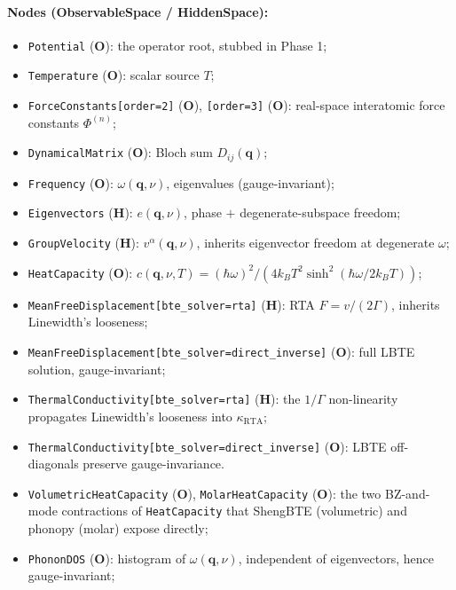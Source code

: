 \documentclass[11pt,a4paper]{article}
\begin{document}
\paragraph{Nodes (ObservableSpace / HiddenSpace):}
\begin{itemize}[leftmargin=2em, itemsep=0.2em]
  \item \texttt{Potential} (\textbf{O}): the operator root, stubbed in Phase 1;
  \item \texttt{Temperature} (\textbf{O}): scalar source $T$;
  \item \texttt{ForceConstants[order=2]} (\textbf{O}), \texttt{[order=3]} (\textbf{O}):
        real-space interatomic force constants $\Phi^{(n)}$;
  \item \texttt{DynamicalMatrix} (\textbf{O}): Bloch sum $D_{ij}(\mathbf{q})$;
  \item \texttt{Frequency} (\textbf{O}): $\omega(\mathbf{q},\nu)$, eigenvalues
        (gauge-invariant);
  \item \texttt{Eigenvectors} (\textbf{H}): $e(\mathbf{q},\nu)$, phase $+$
        degenerate-subspace freedom;
  \item \texttt{GroupVelocity} (\textbf{H}): $v^\alpha(\mathbf{q},\nu)$, inherits
        eigenvector freedom at degenerate $\omega$;
  \item \texttt{HeatCapacity} (\textbf{O}): $c(\mathbf{q},\nu, T) = (\hbar\omega)^2 /
        (4 k_B T^2 \sinh^2(\hbar\omega / 2 k_B T))$;
  \item \texttt{MeanFreeDisplacement[bte\_solver=rta]} (\textbf{H}): RTA
        $F = v/(2\Gamma)$, inherits Linewidth's looseness;
  \item \texttt{MeanFreeDisplacement[bte\_solver=direct\_inverse]} (\textbf{O}): full
        LBTE solution, gauge-invariant;
  \item \texttt{ThermalConductivity[bte\_solver=rta]} (\textbf{H}): the $1/\Gamma$
        non-linearity propagates Linewidth's looseness into $\kappa_\text{RTA}$;
  \item \texttt{ThermalConductivity[bte\_solver=direct\_inverse]} (\textbf{O}):
        LBTE off-diagonals preserve gauge-invariance.
  \item \texttt{VolumetricHeatCapacity} (\textbf{O}), \texttt{MolarHeatCapacity}
        (\textbf{O}): the two BZ-and-mode contractions of \texttt{HeatCapacity}
        that ShengBTE (volumetric) and phonopy (molar) expose directly;
  \item \texttt{PhononDOS} (\textbf{O}): histogram of $\omega(\mathbf{q},\nu)$,
        independent of eigenvectors, hence gauge-invariant;

\end{itemize}
\end{document}
